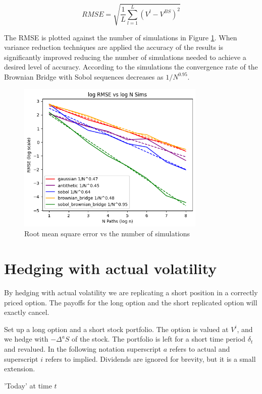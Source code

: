 \documentclass{article}
\newcommand{\para}{\vspace{8pt}} %
\begin{document}
\[
RMSE = \sqrt{\frac{1}{L} \sum_{l=1}^{L} (V^l - V^{BS})^2}
\]

The RMSE is plotted against the number of simulations in Figure \ref{fig:rmse}. When variance reduction techniques are
applied the accuracy of the results is significantly improved reducing the number of simulations needed to achieve
a desired level of accuracy.  According to the simulations the convergence rate of the Brownian Bridge with Sobol sequences
decreases as $1/N^{0.95}$.

\begin{figure}[h]
    \centering
    \includegraphics[width=0.8\textwidth]{images/rmse.png}
    \caption{Root mean square error vs the number of simulations}
    \label{fig:rmse}
\end{figure}

\newpage

\section{Hedging with actual volatility}

By hedging with actual volatility we are replicating a short position in a correctly priced option. The payoffs for the long option and the short replicated option will
exactly cancel.

Set up a long option and a short stock portfolio. The option is valued at $V^i$, and we hedge with $-\Delta^a S$ of the stock.
The portfolio is left for a short time period $\delta_t$ and revalued.  In the following notation superscript $a$ refers to actual
and superscript $i$ refers to implied.  Dividends are ignored for brevity, but it is a small extension.

\para
'Today' at time $t$
\end{document}
